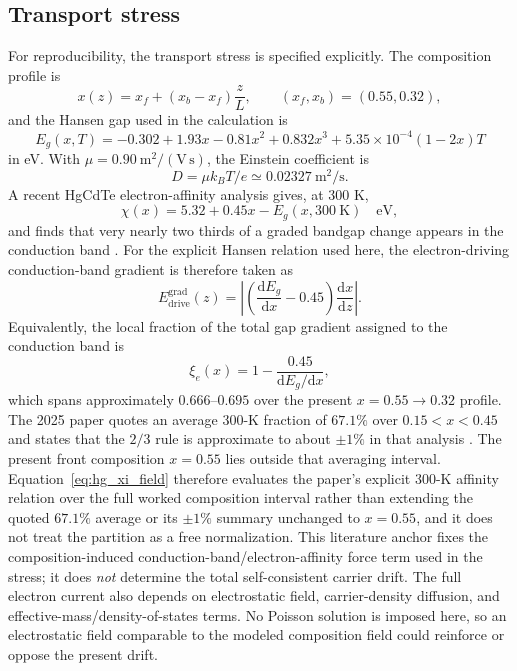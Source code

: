 \documentclass[11pt]{article}
\newcommand{\dd}{\mathrm{d}}
\begin{document}
\subsection{Transport stress}

For reproducibility, the transport stress is specified explicitly. The composition profile is
\begin{equation}
x(z)=x_f+(x_b-x_f)\frac{z}{L},\qquad (x_f,x_b)=(0.55,0.32),
\end{equation}
and the Hansen gap used in the calculation is
\begin{equation}
\boxed{E_g(x,T)=-0.302+1.93x-0.81x^2+0.832x^3+5.35\times10^{-4}(1-2x)T}
\label{eq:hansen_explicit}
\end{equation}
in eV. With $\mu=0.90~\mathrm{m^2/(V\,s)}$, the Einstein coefficient is
\begin{equation}
D=\mu k_BT/e\simeq0.02327~\mathrm{m^2/s}.
\end{equation}
A recent HgCdTe electron-affinity analysis gives, at 300 K,
\begin{equation}
\boxed{\chi(x)=5.32+0.45x-E_g(x,300~\mathrm K)\quad \mathrm{eV},}
\label{eq:hg_affinity}
\end{equation}
and finds that very nearly two thirds of a graded bandgap change appears in the conduction band \cite{RhigerMustafa2025}. For the explicit Hansen relation used here, the electron-driving conduction-band gradient is therefore taken as
\begin{equation}
\boxed{E_{\mathrm{drive}}^{\mathrm{grad}}(z)=\left|\left(\frac{\dd E_g}{\dd x}-0.45\right)\frac{\dd x}{\dd z}\right|.}
\label{eq:hg_xi_field}
\end{equation}
Equivalently, the local fraction of the total gap gradient assigned to the conduction band is
\begin{equation}
\xi_e(x)=1-\frac{0.45}{\dd E_g/\dd x},
\end{equation}
which spans approximately $0.666$--$0.695$ over the present $x=0.55\rightarrow0.32$ profile. The 2025 paper quotes an average 300-K fraction of $67.1\%$ over $0.15<x<0.45$ and states that the $2/3$ rule is approximate to about $\pm1\%$ in that analysis \cite{RhigerMustafa2025}. The present front composition $x=0.55$ lies outside that averaging interval. Equation~\eqref{eq:hg_xi_field} therefore evaluates the paper's explicit 300-K affinity relation over the full worked composition interval rather than extending the quoted $67.1\%$ average or its $\pm1\%$ summary unchanged to $x=0.55$, and it does not treat the partition as a free normalization. This literature anchor fixes the composition-induced conduction-band/electron-affinity force term used in the stress; it does \emph{not} determine the total self-consistent carrier drift. The full electron current also depends on electrostatic field, carrier-density diffusion, and effective-mass/density-of-states terms. No Poisson solution is imposed here, so an electrostatic field comparable to the modeled composition field could reinforce or oppose the present drift.
\end{document}
